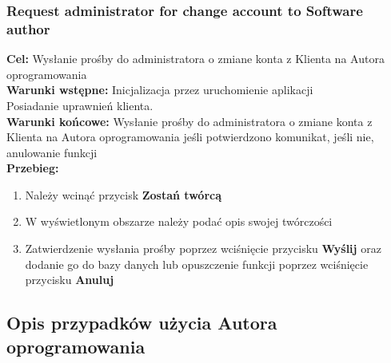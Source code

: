 \documentclass[12pt,a4paper]{article}
\begin{document}
\subsubsection{Request administrator for change account to Software author}
\textbf{Cel: } Wysłanie prośby do administratora o zmiane konta z Klienta na Autora oprogramowania \\
\textbf{Warunki wstępne:} Inicjalizacja przez uruchomienie aplikacji\\ Posiadanie uprawnień klienta.\\
\textbf{Warunki końcowe:} Wysłanie prośby do administratora o zmiane konta z Klienta na Autora oprogramowania jeśli potwierdzono komunikat, jeśli nie, anulowanie funkcji\\
\textbf{Przebieg:}
\begin{enumerate}
    \item Należy wcinąć przycisk \textbf{Zostań twórcą}
    \item W wyświetlonym obszarze należy podać opis swojej twórczości
    \item Zatwierdzenie wysłania prośby poprzez wciśnięcie przycisku \textbf{Wyślij} oraz dodanie go do bazy danych lub opuszczenie funkcji poprzez wciśnięcie przycisku \textbf{Anuluj}
\end{enumerate}

\subsection{Opis przypadków użycia Autora oprogramowania}

\end{document}
